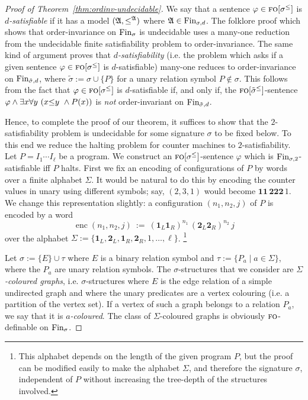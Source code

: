 \documentclass[11pt]{article}
\renewcommand{\phi}{\varphi}
\newcommand{\fin}{\textup{Fin}}
\newcommand{\logic}[1]{\textsc{#1}}
\newcommand{\FO}{\logic{fo}}
\newcommand{\st}{\mathbin |}
\newcommand{\leqsym}{\logic{\ensuremath{\leq}}}
\newcommand{\struct}[1]{\mathfrak{#1}}
\newcommand{\AS}{\struct{A}}
\newcommand{\set}[1]{\{#1\}}
\newcommand{\setc}[2]{\{#1 \st #2\}}
\newcommand{\union}{\cup}
\newcommand{\IONE}{\mathbf{1}}
\newcommand{\ITWO}{\mathbf{2}}
\newcommand{\IONEL}{\IONE_L}
\newcommand{\IONER}{\IONE_R}
\newcommand{\ITWOL}{\ITWO_L}
\newcommand{\ITWOR}{\ITWO_R}
\newcommand{\enc}{\operatorname{enc}} \newcommand{\inc}{\textsc{inc}}
\begin{document}
\begin{proof}[Proof of Theorem~\ref{thm:ordinv-undecidable}]
  We say that a sentence $\phi\in \FO[\sigma^{\leq}]$ is
  \emph{$d$-satisfiable} if it has a model $(\AS,\leqsym^\AS)$ where
  $\AS\in\fin_{\sigma,d}$.  The folklore proof which shows that
  order-invariance on $\fin_\sigma$ is undecidable uses a many-one
  reduction from the undecidable finite satisfiability problem to
  order-invariance.  The same kind of argument proves that
  \emph{$d$-satisfiability} (i.e. the problem which asks if a given
  sentence $\phi\in \FO[\sigma^{\leq}]$ is $d$-satisfiable) many-one
  reduces to order-invariance on $\fin_{\tilde\sigma,d}$, where $\tilde\sigma :=
  \sigma \union \set{P}$ for a unary relation symbol $P\notin \sigma$.
  This follows from the fact that $\phi\in\FO[\sigma^{\leq}]$ is
  $d$-satisfiable if, and only if, the $\FO[{\tilde\sigma}^{\leq}]$-sentence
  $\phi \land \exists x \forall y\ (x \leqsym y\ \land P(x))$
  is \emph{not} order-invariant on $\fin_{\tilde\sigma,d}$.

  Hence, to complete the proof of our theorem, it suffices to show
  that the $2$-satisfiability problem is undecidable for some
  signature $\sigma$ to be fixed below. To this end we reduce the
  halting problem for counter machines to $2$-satisfiability.  Let
  $P=I_1\dotsb I_\ell$ be a program. We construct an
  $\FO[\sigma^{\leq}]$-sentence $\phi$ which is
  $\fin_{\sigma,2}$-satisfiable iff $P$ halts.  First we fix an
  encoding of configurations of $P$ by words over a finite alphabet
  $\Sigma$. It would be natural to do this by encoding the counter values
  in unary using different symbols; say, $(2,3,1)$ would become
  $\IONE\IONE\,\ITWO\ITWO\ITWO\,1$. We change this representation
  slightly: a configuration $(n_1,n_2,j)$ of $P$ is encoded by a word
  \[
  \enc(n_1,n_2,j)\ :=\ (\IONEL\IONER)^{n_1}\, (\ITWOL\ITWOR)^{n_2}\, j
  \]
  over the alphabet $\Sigma:=\set{\IONEL,\ITWOL, \IONER,\ITWOR, 1,
    \ldots, \ell}$.
  \footnote{This alphabet depends on the length of
    the given program $P$, but the proof can be
    modified easily to make the alphabet $\Sigma$, and therefore the signature $\sigma$, independent of $P$ without increasing the tree-depth of the structures involved.}

  Let $\sigma := \set{E} \union \tau$ where $E$ is a binary relation
  symbol and $\tau := \setc{P_a}{a\in \Sigma}$, where the $P_a$ are
  unary relation symbols.  The $\sigma$-structures that we consider
  are \emph{$\Sigma$-coloured graphs}, i.e. $\sigma$-structures where
  $E$ is the edge relation of a simple undirected graph and where the
  unary predicates are a vertex colouring (i.e. a partition of the
  vertex set). If a vertex of such a graph belongs to a relation
  $P_a$, we say that it is \emph{$a$-coloured}. The class of
  $\Sigma$-coloured graphs is obviously $\FO$-definable on
  $\fin_\sigma$.


\end{proof}
\end{document}
